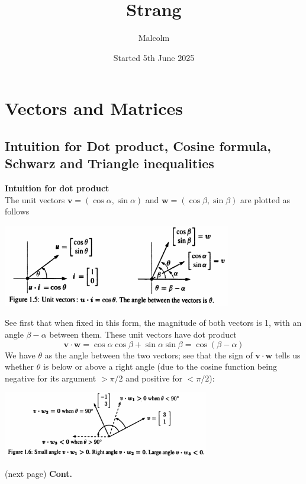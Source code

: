 \documentclass{report}
\title{Strang}
\date{Started 5th June 2025}
\author{Malcolm}
\begin{document}
\maketitle

\tableofcontents

\newpage

\chapter{Vectors and Matrices}
\section{Intuition for Dot product, Cosine formula, Schwarz and Triangle inequalities}
\textbf{Intuition for dot product}\\
The unit vectors $\bm{v}=(\cos\alpha,\sin\alpha)$ and $\bm{w}=(\cos\beta,\sin\beta)$ are plotted as follows
\begin{center}
\includegraphics[width=10cm]{1}
\end{center}
See first that when fixed in this form, the magnitude of both vectors is 1, with an angle $\beta-\alpha$ between them. These unit vectors have dot product
\begin{equation*}
\bm{v}\cdot\bm{w}=\cos\alpha\cos\beta+\sin\alpha\sin\beta=\cos(\beta-\alpha)
\end{equation*}
We have $\theta$ as the angle between the two vectors; see that the sign of $\bm v\cdot\bm w$ tells us whether $\theta$ is below or above a right angle (due
to the cosine function being negative for its argument $>\pi/2$ and positive for $<\pi/2$):
\begin{center}
\includegraphics[width=9cm]{2}
\end{center}
(next page)\newpage
\noindent\textbf{Cont.}\\
\end{document}
